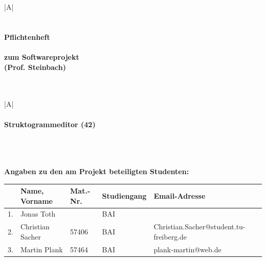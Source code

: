 \documentclass[a4paper,10pt]{report}
\begin{document}
\begin{titlepage}

\begin{center}
\begin{tabular}{|A|}
\hline
\\
\\
\\
\bfseries \Huge \quad \quad \quad  Pflichtenheft   \quad \quad \quad
\\
\\
\Large zum Softwareprojekt\\
\Large (Prof. Steinbach)\\
\\
\\
\hline
\end{tabular}
\end{center}

\vspace{3,5mm}

\begin{center}
\begin{tabular}{|A|}
\hline
\\
\\
\bfseries \Large \quad \quad \quad Struktogrammeditor (42) \quad \quad \quad
\\
\\
\\
\\
\hline
\end{tabular}
\end{center}

\vspace{9mm}

\bfseries \large Angaben zu den am Projekt beteiligten Studenten:

\begin{center}
\begin{tabular}{|c|l|l|l|l|}
\hline
\rowcolor{Gray}\normalsize &\normalsize Name, Vorname &\normalsize Mat.-Nr. &\normalsize Studiengang &\normalsize Email-Adresse \\
\hline
\rowcolor{lightGray}\normalsize 1. &Jonas Toth & &BAI & \\
\hline
\rowcolor{Gray}\normalsize 2. &Christian Sacher &57406 &BAI &Christian.Sacher@student.tu-freiberg.de \\
\hline
\rowcolor{lightGray}\normalsize 3. &Martin Plank&57464 &BAI &plank-martin@web.de  \\
\hline


\end{tabular}
\end{center}
\end{titlepage}
\end{document}
